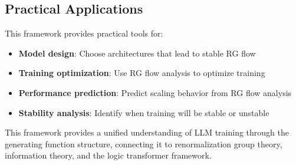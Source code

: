 \subsection{Practical Applications}

\begin{remark}
\label{rem:practical-applications}
This framework provides practical tools for:
\begin{itemize}
\item \textbf{Model design}: Choose architectures that lead to stable RG flow
\item \textbf{Training optimization}: Use RG flow analysis to optimize training
\item \textbf{Performance prediction}: Predict scaling behavior from RG flow analysis
\item \textbf{Stability analysis}: Identify when training will be stable or unstable
\end{itemize}
\end{remark}

This framework provides a unified understanding of LLM training through the generating function structure, connecting it to renormalization group theory, information theory, and the logic transformer framework.
